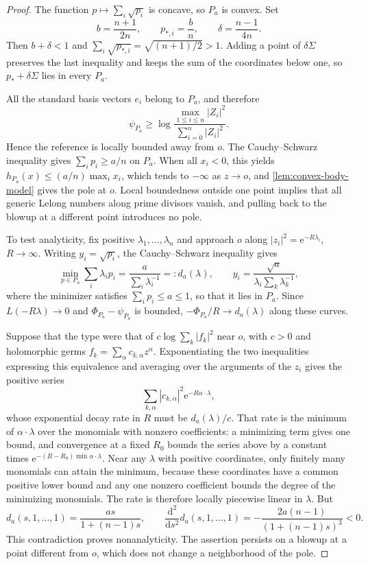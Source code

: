 \begin{proof}
The function $p\mapsto\sum_i\sqrt{p_i}$ is concave, so $P_a$ is convex. Set
\[
 b=\frac{n+1}{2n},\qquad p_{*,i}=\frac bn,
 \qquad\delta=\frac{n-1}{4n}.
\]
Then $b+\delta<1$ and $\sum_i\sqrt{p_{*,i}}=\sqrt{(n+1)/2}>1$. Adding a point of $\delta\Sigma$ preserves the last inequality and keeps the sum of the coordinates below one, so $p_*+\delta\Sigma$ lies in every $P_a$.

All the standard basis vectors $e_i$ belong to $P_a$, and therefore
\[
 \psi_{P_a}\geq\log\frac{\max_{1\leq i\leq n}|Z_i|^2}
                                  {\sum_{i=0}^n|Z_i|^2}.
\]
Hence the reference is locally bounded away from $o$. The Cauchy--Schwarz inequality gives $\sum_ip_i\geq a/n$ on $P_a$. When all $x_i<0$, this yields $h_{P_a}(x)\leq(a/n)\max_i x_i$, which tends to $-\infty$ as $z\to o$, and \cref{lem:convex-body-model} gives the pole at $o$. Local boundedness outside one point implies that all generic Lelong numbers along prime divisors vanish, and pulling back to the blowup at a different point introduces no pole.

To test analyticity, fix positive $\lambda_1,\ldots,\lambda_n$ and approach $o$ along $|z_i|^2=\mathrm{e}^{-R\lambda_i}$, $R\to\infty$. Writing $y_i=\sqrt{p_i}$, the Cauchy--Schwarz inequality gives
\begin{equation}\label{eq:curved-directional-coefficient}
 \min_{p\in P_a}\sum_i\lambda_i p_i
 =\frac a{\sum_i\lambda_i^{-1}}=:d_a(\lambda),\qquad
 y_i=\frac{\sqrt a}{\lambda_i\sum_k\lambda_k^{-1}},
\end{equation}
where the minimizer satisfies $\sum_ip_i\leq a\leq1$, so that it lies in $P_a$. Since $L(-R\lambda)\to0$ and $\Phi_{P_a}-\psi_{P_a}$ is bounded, $-\Phi_{P_a}/R\to d_a(\lambda)$ along these curves.

Suppose that the type were that of $c\log\sum_k|f_k|^2$ near $o$, with $c>0$ and holomorphic germs $f_k=\sum_\alpha c_{k,\alpha}z^\alpha$. Exponentiating the two inequalities expressing this equivalence and averaging over the arguments of the $z_i$ gives the positive series
\[
 \sum_{k,\alpha}|c_{k,\alpha}|^2\mathrm{e}^{-R\alpha\cdot\lambda},
\]
whose exponential decay rate in $R$ must be $d_a(\lambda)/c$. That rate is the minimum of $\alpha\cdot\lambda$ over the monomials with nonzero coefficients: a minimizing term gives one bound, and convergence at a fixed $R_0$ bounds the series above by a constant times $\mathrm{e}^{-(R-R_0)\min\alpha\cdot\lambda}$. Near any $\lambda$ with positive coordinates, only finitely many monomials can attain the minimum, because these coordinates have a common positive lower bound and any one nonzero coefficient bounds the degree of the minimizing monomials. The rate is therefore locally piecewise linear in $\lambda$. But
\[
 d_a(s,1,\ldots,1)=\frac{as}{1+(n-1)s},\qquad
 \frac{\mathrm{d}^2}{\mathrm{d}s^2}d_a(s,1,\ldots,1)
 =-\frac{2a(n-1)}{(1+(n-1)s)^3}<0.
\]
This contradiction proves nonanalyticity. The assertion persists on a blowup at a point different from $o$, which does not change a neighborhood of the pole.


\end{proof}
